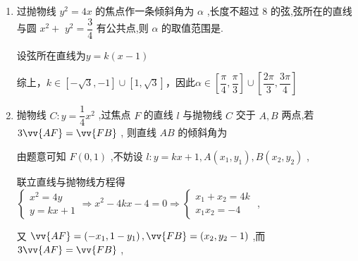 \begin{enumerate}
    \item 过抛物线 ${y}^{2} = {4x}$ 的焦点作一条倾斜角为 $\alpha$ ,长度不超过 8 的弦,弦所在的直线与圆 ${x}^{2} +$  ${y}^{2} = \dfrac{3}{4}$ 有公共点,则 $\alpha$ 的取值范围是.
    \begin{jieda}
        设弦所在直线为$y = k(x-1)$
        综上，$k \in [-\sqrt{3}, -1] \cup [1, \sqrt{3}]$，因此$\alpha \in \left[\dfrac{\pi}{4}, \dfrac{\pi}{3}\right] \cup \left[\dfrac{2\pi}{3}, \dfrac{3\pi}{4}\right]$
    \end{jieda}
    
    \item 抛物线 $C : y = \dfrac{1}{4}{x}^{2}$ ,过焦点 $F$ 的直线 $l$ 与抛物线 $C$ 交于 $A,B$ 两点,若 $3\vv{AF} = \vv{FB}$ , 则直线 ${AB}$ 的倾斜角为
    \begin{jieda}
        由题意可知 $F\left( {0,1}\right)$ ,不妨设 $l : y = {kx} + 1,A\left( {{x}_{1},{y}_{1}}\right) ,B\left( {{x}_{2},{y}_{2}}\right)$ ,
        
        联立直线与抛物线方程得 $\left\{  \begin{array}{l} {x}^{2} = {4y} \\  y = {kx} + 1 \end{array} \Longrightarrow  {x}^{2} - {4kx} - 4 = 0 \Longrightarrow  \left \{\begin{array}{l}
             {x}_{1} + {x}_{2} = {4k}  \\
             {x}_{1}{x}_{2} =  - 4
        \end{array}\right. \right.$ ,
        
        又 $\vv{AF} = \left( {-{x}_{1},1 - {y}_{1}}\right) ,\vv{FB} = \left( {{x}_{2},{y}_{2} - 1}\right)$ ,而 $3\vv{AF} = \vv{FB}$ ,
        

\end{jieda}
\end{enumerate}
